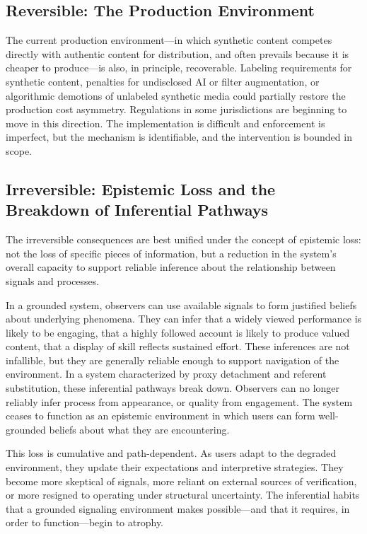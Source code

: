 \documentclass[12pt, a4paper]{article}
\begin{document}
\subsection{Reversible: The Production Environment}

The current production environment---in which synthetic content competes directly with authentic content for distribution, and often prevails because it is cheaper to produce---is also, in principle, recoverable. Labeling requirements for synthetic content, penalties for undisclosed AI or filter augmentation, or algorithmic demotions of unlabeled synthetic media could partially restore the production cost asymmetry. Regulations in some jurisdictions are beginning to move in this direction. The implementation is difficult and enforcement is imperfect, but the mechanism is identifiable, and the intervention is bounded in scope.

\subsection{Irreversible: Epistemic Loss and the Breakdown of Inferential Pathways}

The irreversible consequences are best unified under the concept of epistemic loss: not the loss of specific pieces of information, but a reduction in the system's overall capacity to support reliable inference about the relationship between signals and processes.

In a grounded system, observers can use available signals to form justified beliefs about underlying phenomena. They can infer that a widely viewed performance is likely to be engaging, that a highly followed account is likely to produce valued content, that a display of skill reflects sustained effort. These inferences are not infallible, but they are generally reliable enough to support navigation of the environment. In a system characterized by proxy detachment and referent substitution, these inferential pathways break down. Observers can no longer reliably infer process from appearance, or quality from engagement. The system ceases to function as an epistemic environment in which users can form well-grounded beliefs about what they are encountering.

This loss is cumulative and path-dependent. As users adapt to the degraded environment, they update their expectations and interpretive strategies. They become more skeptical of signals, more reliant on external sources of verification, or more resigned to operating under structural uncertainty. The inferential habits that a grounded signaling environment makes possible---and that it requires, in order to function---begin to atrophy.
\end{document}
